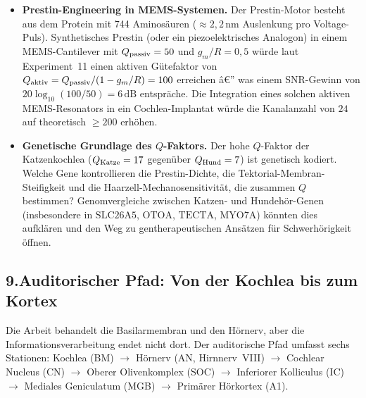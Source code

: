 ﻿\documentclass[12pt,a4paper,titlepage]{report}
\begin{document}
\begin{itemize}[leftmargin=2em]
    oder ob akustische Spezialisten (Fledermäuse, Delphine) lokal
    höhere $\Omega$-Werte erreichen.
  \item \textbf{Prestin-Engineering in MEMS-Systemen.}
    Der Prestin-Motor besteht aus dem Protein mit
    744 Aminosäuren ($\approx 2{,}2\,\mathrm{nm}$ Auslenkung pro Voltage-Puls).
    Synthetisches Prestin (oder ein piezoelektrisches Analogon)
    in einem MEMS-Cantilever mit
    $Q_{\rm passiv} = 50$ und $g_m/R = 0{,}5$ würde laut
    Experiment~11 einen aktiven Gütefaktor von
    $Q_{\rm aktiv} = Q_{\rm passiv} / (1 - g_m/R) = 100$ erreichen â€”
    was einem SNR-Gewinn von $20\log_{10}(100/50) = 6\,\mathrm{dB}$ entspräche.
    Die Integration eines solchen aktiven MEMS-Resonators in
    ein Cochlea-Implantat würde die Kanalanzahl von $24$ auf
    theoretisch $\geq 200$ erhöhen.
  \item \textbf{Genetische Grundlage des $Q$-Faktors.}
    Der hohe $Q$-Faktor der Katzenkochlea ($Q_{\rm Katze} = 17$
    gegenüber $Q_{\rm Hund} = 7$) ist genetisch kodiert.
    Welche Gene kontrollieren die Prestin-Dichte,
    die Tektorial-Membran-Steifigkeit und die
    Haarzell-Mechanosensitivität, die zusammen $Q$ bestimmen?
    Genomvergleiche zwischen Katzen- und Hundehör-Genen
    (insbesondere in $\mathrm{SLC26A5}$, $\mathrm{OTOA}$,
    $\mathrm{TECTA}$, $\mathrm{MYO7A}$) könnten dies aufklären
    und den Weg zu gentherapeutischen Ansätzen für Schwerhörigkeit öffnen.
\end{itemize}

\subsection*{9.\enspace Auditorischer Pfad: Von der Kochlea bis zum Kortex}

Die Arbeit behandelt die Basilarmembran und den Hörnerv,
aber die Informationsverarbeitung endet nicht dort.
Der auditorische Pfad umfasst sechs Stationen:
Kochlea (BM) $\to$ Hörnerv (AN, Hirnnerv~VIII) $\to$
Cochlear Nucleus (CN) $\to$ Oberer Olivenkomplex (SOC) $\to$
Inferiorer Kolliculus (IC) $\to$
Mediales Geniculatum (MGB) $\to$ Primärer Hörkortex (A1).
\end{document}
